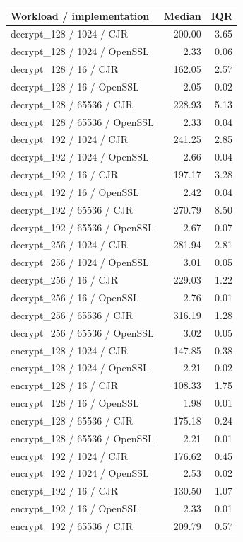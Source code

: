 \begin{longtable}{p{}rr}Workload / implementation & Median & IQR \\ \hline
decrypt\_128 / 1024 / CJR & 200.00 & 3.65 \\
decrypt\_128 / 1024 / OpenSSL & 2.33 & 0.06 \\
decrypt\_128 / 16 / CJR & 162.05 & 2.57 \\
decrypt\_128 / 16 / OpenSSL & 2.05 & 0.02 \\
decrypt\_128 / 65536 / CJR & 228.93 & 5.13 \\
decrypt\_128 / 65536 / OpenSSL & 2.33 & 0.04 \\
decrypt\_192 / 1024 / CJR & 241.25 & 2.85 \\
decrypt\_192 / 1024 / OpenSSL & 2.66 & 0.04 \\
decrypt\_192 / 16 / CJR & 197.17 & 3.28 \\
decrypt\_192 / 16 / OpenSSL & 2.42 & 0.04 \\
decrypt\_192 / 65536 / CJR & 270.79 & 8.50 \\
decrypt\_192 / 65536 / OpenSSL & 2.67 & 0.07 \\
decrypt\_256 / 1024 / CJR & 281.94 & 2.81 \\
decrypt\_256 / 1024 / OpenSSL & 3.01 & 0.05 \\
decrypt\_256 / 16 / CJR & 229.03 & 1.22 \\
decrypt\_256 / 16 / OpenSSL & 2.76 & 0.01 \\
decrypt\_256 / 65536 / CJR & 316.19 & 1.28 \\
decrypt\_256 / 65536 / OpenSSL & 3.02 & 0.05 \\
encrypt\_128 / 1024 / CJR & 147.85 & 0.38 \\
encrypt\_128 / 1024 / OpenSSL & 2.21 & 0.02 \\
encrypt\_128 / 16 / CJR & 108.33 & 1.75 \\
encrypt\_128 / 16 / OpenSSL & 1.98 & 0.01 \\
encrypt\_128 / 65536 / CJR & 175.18 & 0.24 \\
encrypt\_128 / 65536 / OpenSSL & 2.21 & 0.01 \\
encrypt\_192 / 1024 / CJR & 176.62 & 0.45 \\
encrypt\_192 / 1024 / OpenSSL & 2.53 & 0.02 \\
encrypt\_192 / 16 / CJR & 130.50 & 1.07 \\
encrypt\_192 / 16 / OpenSSL & 2.33 & 0.01 \\
encrypt\_192 / 65536 / CJR & 209.79 & 0.57 \\

\end{longtable}
